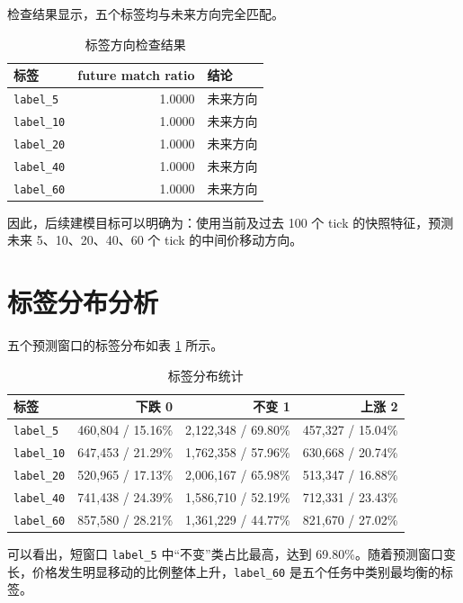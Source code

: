 \documentclass[UTF8,a4paper,12pt]{ctexart}
\begin{document}
检查结果显示，五个标签均与未来方向完全匹配。

\begin{table}[H]
\centering
\caption{标签方向检查结果}
\begin{tabular}{lrl}
\toprule
标签 & future match ratio & 结论 \\
\midrule
\texttt{label\_5} & 1.0000 & 未来方向 \\
\texttt{label\_10} & 1.0000 & 未来方向 \\
\texttt{label\_20} & 1.0000 & 未来方向 \\
\texttt{label\_40} & 1.0000 & 未来方向 \\
\texttt{label\_60} & 1.0000 & 未来方向 \\
\bottomrule
\end{tabular}
\end{table}

因此，后续建模目标可以明确为：使用当前及过去 100 个 tick 的快照特征，预测未来 5、10、20、40、60 个 tick 的中间价移动方向。

\section{标签分布分析}

五个预测窗口的标签分布如表 \ref{tab:label_dist} 所示。

\begin{table}[H]
\centering
\caption{标签分布统计}
\label{tab:label_dist}
\begin{tabular}{lrrr}
\toprule
标签 & 下跌 0 & 不变 1 & 上涨 2 \\
\midrule
\texttt{label\_5} & 460,804 / 15.16\% & 2,122,348 / 69.80\% & 457,327 / 15.04\% \\
\texttt{label\_10} & 647,453 / 21.29\% & 1,762,358 / 57.96\% & 630,668 / 20.74\% \\
\texttt{label\_20} & 520,965 / 17.13\% & 2,006,167 / 65.98\% & 513,347 / 16.88\% \\
\texttt{label\_40} & 741,438 / 24.39\% & 1,586,710 / 52.19\% & 712,331 / 23.43\% \\
\texttt{label\_60} & 857,580 / 28.21\% & 1,361,229 / 44.77\% & 821,670 / 27.02\% \\
\bottomrule
\end{tabular}
\end{table}

可以看出，短窗口 \texttt{label\_5} 中“不变”类占比最高，达到 69.80\%。随着预测窗口变长，价格发生明显移动的比例整体上升，\texttt{label\_60} 是五个任务中类别最均衡的标签。
\end{document}

